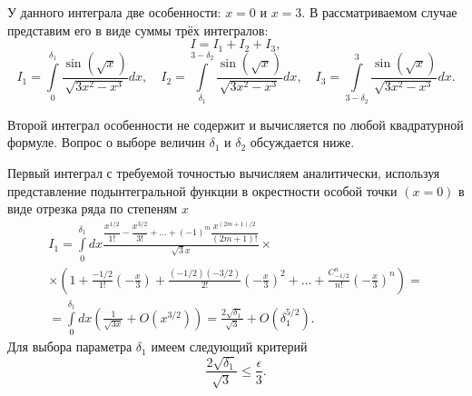 \documentclass[a4paper]{article}
\begin{document}
\begin{sol}
У данного интеграла две особенности: $x=0$ и $x=3$.
В рассматриваемом случае  представим его в виде
суммы трёх интегралов:
\[
I=I_1+I_2+I_3,
\] 
\[
I_1= \int\limits_{0}^{\delta_1} \frac{
\sin\left( \sqrt{x}  \right) }{\sqrt{3x^2-x^3} }dx,\quad
I_2= \int\limits_{\delta_1}^{3-\delta_2} \frac{\sin\left( \sqrt{x}  \right) }{\sqrt{3x^2-x^3} }dx ,\quad
I_3= \int\limits_{3-\delta_2}^{3} \frac{\sin\left( \sqrt{x}  \right) }{\sqrt{3x^2-x^3} }dx 
.\] 

Второй интеграл особенности не содержит и вычисляется по
любой квадратурной формуле. Вопрос о выборе величин $\delta_1$ 
и $\delta_2$
обсуждается ниже.

Первый интеграл с требуемой точностью вычисляем аналитически,
используя представление подынтегральной функции в окрестности
особой точки $(x=0)$ в виде отрезка ряда по степеням $x$
\begin{multline*}
I_1= \int\limits_{0}^{\delta_1} dx
\frac{\dfrac{x^{1/2}}{1!}-\dfrac{x^{3/2}}{3!}+\ldots+(-1)^m \dfrac{x^{(2m+1)/2}}{
(2m+1)!}}{\sqrt{3} x}\times\\ \times\left( 1+ \frac{-1 /2}{1!}\left( -\frac{x}{3} \right) + \frac{(-1 /2)(-3 /2)}{2!}\left( - \frac{x}{3} \right) ^2 +\ldots+\frac{C_{-1 /2}^n}{n!}\left( - \frac{x}{3} \right) ^n\right) =
\\=\int\limits_{0}^{\delta_1} dx \left(\frac{1}{\sqrt{3x} }+
O\left( x^{3 /2} \right) \right)=
\frac{2 \sqrt{\delta_1} }{\sqrt{3} }+
O\left( \delta_1^{5 /2} \right) 
.\end{multline*} 
Для выбора параметра $\delta_1$ имеем следующий критерий
\[
\frac{2\sqrt{\delta_1} }{\sqrt{3} }\le \frac{\epsilon}{3}
.\]


\end{sol}
\end{document}
